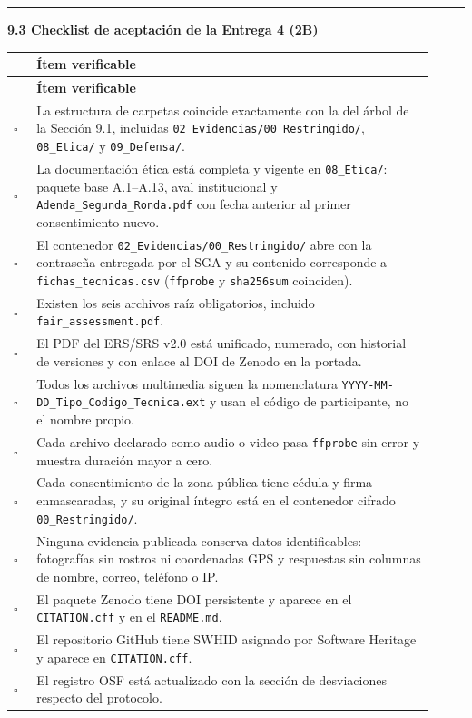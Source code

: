 \documentclass[11pt,a4paper]{article}
\newcounter{secc}
\newcommand{\submark}[1]{\par\vspace{4pt}\noindent
    {\color{uteqgreen}\rule[-1pt]{3.5pt}{12pt}}\hspace{6pt}\textbf{\color{uteqgreen}#1}\par\vspace{2pt}}
\newcommand{\hh}[1]{\cellcolor{uteqgreen}\textbf{\color{white}\small #1}}
\begin{document}
\submark{9.3 Checklist de aceptación de la Entrega 4 (2B)}
\begin{longtable}{@{}p{0.05\linewidth} p{0.87\linewidth}@{}}
    \hh{\phantom{X}} & \hh{Ítem verificable}\\
    \endfirsthead
    \hh{\phantom{X}} & \hh{Ítem verificable}\\
    \endhead
    $\square$ & La estructura de carpetas coincide exactamente con la del árbol de la Sección 9.1, incluidas \texttt{02\_Evidencias/00\_Restringido/}, \texttt{08\_Etica/} y \texttt{09\_Defensa/}.\\
    $\square$ & La documentación ética está completa y vigente en \texttt{08\_Etica/}: paquete base A.1--A.13, aval institucional y \texttt{Adenda\_Segunda\_Ronda.pdf} con fecha anterior al primer consentimiento nuevo.\\
    $\square$ & El contenedor \texttt{02\_Evidencias/00\_Restringido/} abre con la contraseña entregada por el SGA y su contenido corresponde a \texttt{fichas\_tecnicas.csv} (\texttt{ffprobe} y \texttt{sha256sum} coinciden).\\
    $\square$ & Existen los seis archivos raíz obligatorios, incluido \texttt{fair\_assessment.pdf}.\\
    $\square$ & El PDF del ERS/SRS v2.0 está unificado, numerado, con historial de versiones y con enlace al DOI de Zenodo en la portada.\\
    $\square$ & Todos los archivos multimedia siguen la nomenclatura \texttt{YYYY-MM-DD\_Tipo\_Codigo\_Tecnica.ext} y usan el código de participante, no el nombre propio.\\
    $\square$ & Cada archivo declarado como audio o video pasa \texttt{ffprobe} sin error y muestra duración mayor a cero.\\
    $\square$ & Cada consentimiento de la zona pública tiene cédula y firma enmascaradas, y su original íntegro está en el contenedor cifrado \texttt{00\_Restringido/}.\\
    $\square$ & Ninguna evidencia publicada conserva datos identificables: fotografías sin rostros ni coordenadas GPS y respuestas sin columnas de nombre, correo, teléfono o IP.\\
    $\square$ & El paquete Zenodo tiene DOI persistente y aparece en el \texttt{CITATION.cff} y en el \texttt{README.md}.\\
    $\square$ & El repositorio GitHub tiene SWHID asignado por Software Heritage y aparece en \texttt{CITATION.cff}.\\
    $\square$ & El registro OSF está actualizado con la sección de desviaciones respecto del protocolo.\\

\end{longtable}
\end{document}
